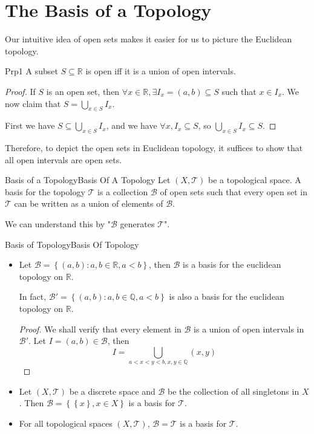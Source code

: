 \documentclass[../main.tex]{subfiles}
\begin{document}
\section{The Basis of a Topology}
Our intuitive idea of open sets makes it easier for us to picture the Euclidean topology.
\begin{proposition}{}{Prp1}
A subset  $S \subseteq \mathbb{R}$ is open iff it is a union of open intervals.
\end{proposition}
\begin{proof}
If $S$ is an open set, then $\forall x\in \mathbb{R}, \exists I_x = (a,b) \subseteq S$ such that $x\in I_x$. We now claim that $S = \bigcup_{x\in S} I_x$.

First we have $S \subseteq \bigcup_{x\in S} I_x$, and we have $\forall x, I_x \subseteq S$, so $\bigcup_{x\in S} I_x \subseteq S$.
\end{proof}

Therefore, to depict the open sets in Euclidean topology, it suffices to show that all open intervals are open sets.

\begin{definition}{Basis of a Topology}{Basis Of A Topology}
	Let $(X,\mathcal{T})$ be a topological space. A basis for the topology $\mathcal{T}$ is a collection $\mathcal{B}$ of open sets such that every open set in $\mathcal{T}$ can be written as a union of elements of $\mathcal{B}$.
\end{definition}
We can understand this by "$\mathcal{B}$ generates $\mathcal{T}$".

\begin{example}{Basis of Topology}{Basis Of Topology}
\begin{itemize}
\item Let $\mathcal{B} = \left\{ (a,b): a,b\in \mathbb{R}, a<b \right\}$, then $\mathcal{B}$ is a basis for the euclidean topology on $\mathbb{R}$. 

In fact, $\mathcal{B}' = \left\{ (a,b): a,b\in \mathbb{Q}, a<b \right\}$ is also a basis for the euclidean topology on $\mathbb{R}$.
\begin{proof}
	We shall verify that every element in $\mathcal{B}$ is a union of open intervals in $\mathcal{B}'$. Let $I = (a,b) \in \mathcal{B}$, then 
	\begin{equation*}
	I = \bigcup_{a<x<y<b, x,y\in \mathbb{Q}} (x,y)
	\end{equation*}
\end{proof}
\item Let $(X,\mathcal{T})$ be a discrete space and $\mathcal{B}$ be the collection of all singletons in $X$. Then $\mathcal{B} = \left\{ \left\{ x \right\}, x\in X \right\}$ is a basis for $\mathcal{T}$.
\item For all topological spaces $(X,\mathcal{T})$, $\mathcal{B} = \mathcal{T}$ is a basis for $\mathcal{T}$.
\end{itemize}
\end{example}
\end{document}

